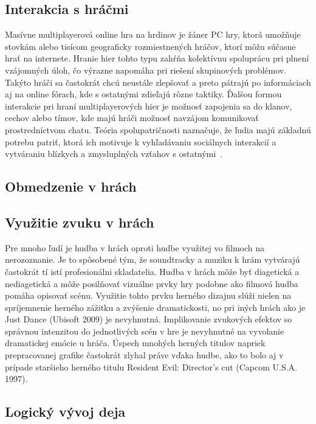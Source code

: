 \documentclass[10pt,twoside,slovak,a4paper]{article}
\begin{document}
\subsection{Interakcia s hráčmi}
Masívne multiplayerová online hra na hrdinov je žáner PC hry, ktorá umožňuje stovkám alebo tisícom geograficky rozmiestnených hráčov, ktorí môžu súčasne hrať na internete\cite{barnett2010virtually}.  Hranie hier tohto typu zahŕňa kolektívnu spoluprácu pri plnení vzájomných úloh, čo výrazne napomáha pri riešení skupinových problémov. Takýto hráči sa častokrát chcú neustále zlepšovať a preto pátrajú po informáciach aj na online fórach, kde s ostatnými zdieľajú rôzne taktiky. Ďalšou formou interakcie pri hraní multiplayerových hier je možnosť zapojenia sa do klanov, cechov alebo tímov, kde majú hráči možnosť navzájom komunikovať prostredníctvom chatu. Teória spolupatričnosti naznačuje, že ľudia majú základnú potrebu patriť, ktorá ich motivuje k vyhľadávaniu sociálnych interakcií a vytváraniu blízkych a zmysluplných vzťahov s ostatnými~\cite{baumeister2017need, heng2021game}.

\subsection{Obmedzenie v hrách}

\subsection{Využitie zvuku v hrách}
Pre mnoho ľudí je hudba v hrách oproti hudbe využitej vo filmoch na nerozoznanie.  Je to spôsobené tým, že soundtracky a muziku k hrám vytvárajú častokrát tí istí profesionálni skladatelia. Hudba v hrách môže byť diagetická a nediagetická a môže posilňovať vizuálne prvky hry podobne ako filmová hudba pomáha opisovať scénu\cite{munday2007music}.  Využitie tohto prvku herného dizajnu slúži nielen na spríjemnenie herného zážitku a zvýšenie dramatickosti, no pri iných hrách ako je Just Dance (Ubisoft 2009) je nevyhnutná. Implikovanie zvukových efektov so správnou intenzitou do jednotlivých scén v hre je nevyhnutné na vyvolanie  dramatickej emócie u hráča.  Úspech mnohých herných titulov napriek prepracovanej grafike častokrát zlyhal práve vďaka hudbe, ako to bolo aj v prípade staršieho herného titulu Resident Evil: Director's cut (Capcom U.S.A. 1997).

\subsection{Logický vývoj deja}
\end{document}
